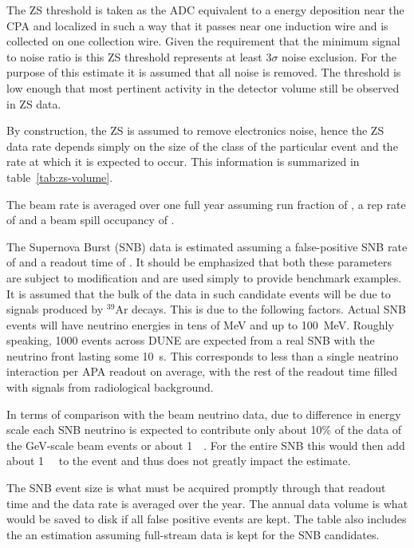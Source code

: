 The ZS threshold is taken as the ADC equivalent to a
\chargezsthreshold
energy deposition near the CPA and localized in such a way that it passes near one
induction wire and is collected on one collection wire.
Given the requirement that the minimum signal to noise ratio is
\chargeminsignalnoiseratio this ZS threshold represents at least $3\sigma$
noise exclusion.
For the purpose of this estimate it is assumed that all noise is
removed.
The threshold is low enough that most pertinent activity in the
detector volume still be observed in ZS data.


 

By construction, the ZS is assumed to remove electronics
noise, hence the ZS data rate depends simply on the size of the class of the particular event and
the rate at which it is expected to occur.
This information is summarized in table~\ref{tab:zs-volume}.



The beam rate is averaged over one full year assuming run fraction of
\beamrunfraction, a rep rate of \beamreprate and a beam spill occupancy
of \beameventoccupancy.

The Supernova Burst (SNB) data is estimated assuming a false-positive SNB
rate of \snbcandrate and a readout time of \snbreadouttime.
It should be emphasized that both these parameters are subject to
modification and are used simply to provide benchmark examples.
It is assumed that the bulk of the data in such candidate events will be due to signals produced by $^{39}$Ar decays.
This is due to the following factors.
Actual SNB events will have neutrino energies in tens of MeV and up to
\SI{100}{\MeV}.
Roughly speaking, 1000 events across DUNE are expected from a real SNB
with the neutrino front lasting some \SI{10}{\second}. This corresponds to less
than a single neatrino interaction per APA readout on average, with the rest of the readout time
filled with signals from radiological background.

In terms of comparison with the beam neutrino data, 
due to difference in energy scale each SNB neutrino is expected to contribute only
about 10\% of the data of the
\si{\GeV}-scale beam events or about \SI{1}{\mega\byte}.
For the entire SNB this would then add about \SI{1}{\giga\byte} to the
event and thus does not greatly impact the estimate.

The SNB event size is what must be acquired promptly through that
readout time and the data rate is averaged over the year.
The annual data volume is what would be saved to disk if all false
positive events are kept.
The table also includes the an estimation assuming full-stream data is
kept for the SNB candidates.

